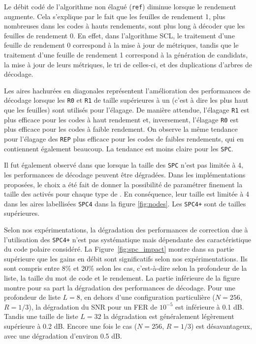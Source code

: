 Le débit codé de l'algorithme non élagué (\texttt{ref}) diminue lorsque le rendement augmente. Cela s'explique par le fait que les feuilles de rendement 1, plus nombreuses dans les codes à hauts rendements, sont plus long à décoder que les feuilles de rendement 0. En effet, dans l'algorithme SCL, le traitement d'une feuille de rendement 0 correspond à la mise à jour de métriques, tandis que le traitement d'une feuille de rendement 1 correspond à la génération de candidats, la mise à jour de leurs métriques, le tri de celles-ci, et des duplications d'arbres de décodage.

Les aires hachurées en diagonales représentent l'amélioration des performances de décodage lorsque les \noeuds \texttt{R0} et \texttt{R1} de taille supérieures à un (c'est à dire les \noeuds plus haut que les feuilles) sont utilisés pour l'élagage. De manière attendue, l'élagage \texttt{R1} est plus efficace pour les codes à haut rendement et, inversement, l'élagage \texttt{R0} est plus efficace pour les codes à faible rendement. On observe la même tendance pour l'élagage des \noeuds \texttt{REP} plus efficace pour les codes de faibles rendements, qui en contiennent également beaucoup. La tendance est moins claire pour les \noeuds \texttt{SPC}.

Il fut également observé dans \cite{sarkis_fast_2014} que lorsque la taille des \noeuds \texttt{SPC} n'est pas limitée à 4, les performances de décodage peuvent être dégradées. Dans les implémentations proposées, le choix a été fait de donner la possibilité de paramétrer finement la taille des \noeuds activés pour chaque type de \noeuds. En conséquence, leur taille est limitée à 4 dans les aires labellisées \texttt{SPC4} dans la figure \ref{fig:nodes}. Les \noeuds \texttt{SPC4+} sont de tailles supérieures. 

Selon nos expérimentations, la dégradation des performances de correction due à l'utilisation des \noeuds \texttt{SPC4+} n'est pas systématique mais dépendante des caractéristique du code polaire considéré. La Figure~\ref{fig:spc_impact} montre dans sa partie supérieure que les gains en débit sont significatifs selon nos expérimentations. Ils sont compris entre 8\% et 20\% selon les cas, c'est-à-dire selon la profondeur de la liste, la taille du mot de code et le rendement. La partie inférieure de la figure montre pour sa part la dégradation des performances de décodage. Pour une profondeur de liste $L=8$, en dehors d'une configuration particulière ($N=256$, $R=1/3$), la dégradation du SNR pour un FER de $10^{-5}$ est inférieure à 0.1 dB. Tandis une taille de liste $L=32$ la dégradation est généralement légèrement supérieure à 0.2 dB. Encore une fois le cas ($N=256$, $R=1/3$) est désavantageux, avec une dégradation d'environ 0.5 dB.

